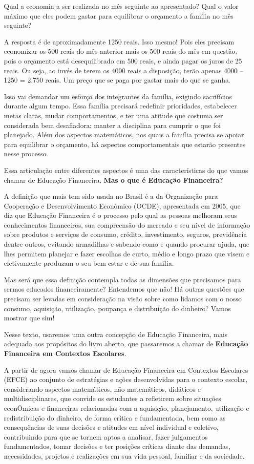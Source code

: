 Qual a economia a ser realizada no mês seguinte ao apresentado? Qual o valor máximo que eles podem gastar para equilibrar o orçamento a família no mês seguinte? 

A resposta é de aproximadamente 1250 reais. Isso mesmo! Pois eles precisam economizar os 500 reais do mês anterior mais os 500 reais do mês em questão, pois o orçamento está desequilibrado em 500 reais, e ainda pagar os juros de 25 reais. Ou seja, ao invés de terem os 4000 reais a disposição, terão apenas 4000 – 1250 = 2.750 reais. Um preço que se paga por gastar mais do que se ganha.

Isso vai demandar um esforço dos integrantes da família, exigindo sacrifícios durante algum tempo. Essa família precisará redefinir prioridades, estabelecer metas claras, mudar comportamentos, e ter uma atitude que costuma ser considerada bem desafiadora: manter a disciplina para cumprir o que foi planejado. Além dos aspectos matemáticos, nos quais a família precisa se apoiar para equilibrar o orçamento, há aspectos comportamentais que estarão presentes nesse processo.

Essa articulação entre diferentes aspectos é uma das características do que vamos chamar de Educação Financeira. \textbf{Mas o que é Educação Financeira?}

A definição que mais tem sido usada no Brasil é a da Organização para Cooperação e Desenvolvimento Econômico (OCDE), apresentada em 2005, que diz que Educação Financeira é o processo pelo qual as pessoas melhoram seus conhecimentos financeiros, sua compreensão do mercado e seu nível de informação sobre produtos e serviços de consumo, crédito, investimento, seguros, previdência dentre outros, evitando armadilhas e sabendo como e quando procurar ajuda, que lhes permitem planejar e fazer escolhas de curto, médio e longo prazo que visem e efetivamente produzam o seu bem estar e de sua família.

Mas será que essa definição contempla todas as dimensões que precisamos para sermos educados financeiramente? Entendemos que não! Há outras questões que precisam ser levadas em consideração na visão sobre como lidamos com o nosso consumo, aquisição, utilização, poupança e distribuição do dinheiro? Vamos mostrar que sim!

Nesse texto, usaremos uma outra concepção de Educação Financeira, mais adequada aos propósitos do livro aberto, que passaremos a chamar de \textbf{Educação Financeira em Contextos Escolares}.

A partir de agora vamos chamar de Educação Financeira em Contextos Escolares (EFCE) ao conjunto de estratégias e ações desenvolvidas para o contexto escolar, considerando aspectos matemáticos, não matemáticos, didáticos e multidisciplinares, que convide os estudantes a refletirem sobre situações econÔmicas e financeiras relacionadas com a aquisição, planejamento, utilização e redistribuição do dinheiro, de forma crítica e fundamentada, bem como as consequências de suas decisões e atitudes em nível individual e coletivo, contribuindo para que se tornem aptos a analisar, fazer julgamentos fundamentados, tomar decisões e ter posições críticas diante das demandas, necessidades, projetos e realizações em sua vida pessoal, familiar e da sociedade.


